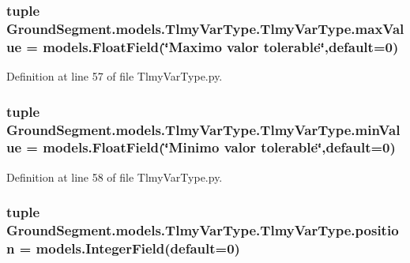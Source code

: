 \subsubsection[{max\+Value}]{\setlength{\rightskip}{0pt plus 5cm}tuple Ground\+Segment.\+models.\+Tlmy\+Var\+Type.\+Tlmy\+Var\+Type.\+max\+Value = models.\+Float\+Field(\char`\"{}Maximo valor tolerable\char`\"{},default=0)\hspace{0.3cm}{\ttfamily [static]}}\label{class_ground_segment_1_1models_1_1_tlmy_var_type_1_1_tlmy_var_type_a3fe5c6c331f85af0dbe2a9c7dee3f9ca}


Definition at line 57 of file Tlmy\+Var\+Type.\+py.

\hypertarget{class_ground_segment_1_1models_1_1_tlmy_var_type_1_1_tlmy_var_type_a8964b78ce3862227c1cbe58c2782a48a}{}
\subsubsection[{min\+Value}]{\setlength{\rightskip}{0pt plus 5cm}tuple Ground\+Segment.\+models.\+Tlmy\+Var\+Type.\+Tlmy\+Var\+Type.\+min\+Value = models.\+Float\+Field(\char`\"{}Minimo valor tolerable\char`\"{},default=0)\hspace{0.3cm}{\ttfamily [static]}}\label{class_ground_segment_1_1models_1_1_tlmy_var_type_1_1_tlmy_var_type_a8964b78ce3862227c1cbe58c2782a48a}


Definition at line 58 of file Tlmy\+Var\+Type.\+py.

\hypertarget{class_ground_segment_1_1models_1_1_tlmy_var_type_1_1_tlmy_var_type_aa3a596ef393485c1f9574fbafc151967}{}
\subsubsection[{position}]{\setlength{\rightskip}{0pt plus 5cm}tuple Ground\+Segment.\+models.\+Tlmy\+Var\+Type.\+Tlmy\+Var\+Type.\+position = models.\+Integer\+Field(default=0)\hspace{0.3cm}{\ttfamily [static]}}\label{class_ground_segment_1_1models_1_1_tlmy_var_type_1_1_tlmy_var_type_aa3a596ef393485c1f9574fbafc151967}


